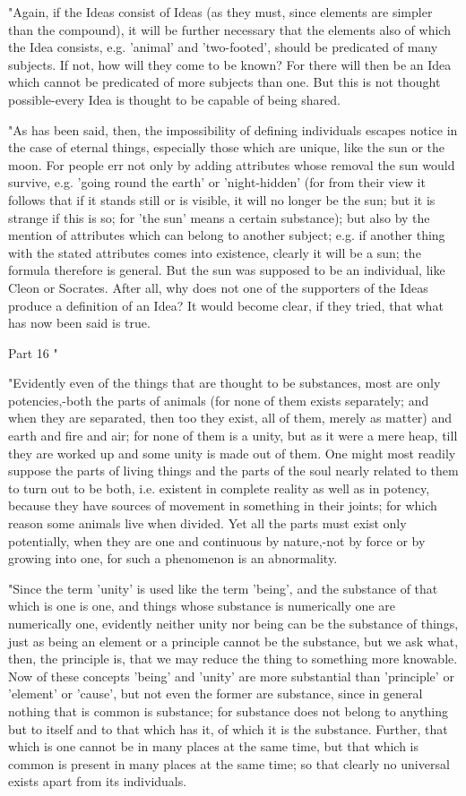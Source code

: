 "Again, if the Ideas consist of Ideas (as they must, since elements
are simpler than the compound), it will be further necessary that
the elements also of which the Idea consists, e.g. 'animal' and 'two-footed',
should be predicated of many subjects. If not, how will they come
to be known? For there will then be an Idea which cannot be predicated
of more subjects than one. But this is not thought possible-every
Idea is thought to be capable of being shared. 

"As has been said, then, the impossibility of defining individuals
escapes notice in the case of eternal things, especially those which
are unique, like the sun or the moon. For people err not only by adding
attributes whose removal the sun would survive, e.g. 'going round
the earth' or 'night-hidden' (for from their view it follows that
if it stands still or is visible, it will no longer be the sun; but
it is strange if this is so; for 'the sun' means a certain substance);
but also by the mention of attributes which can belong to another
subject; e.g. if another thing with the stated attributes comes into
existence, clearly it will be a sun; the formula therefore is general.
But the sun was supposed to be an individual, like Cleon or Socrates.
After all, why does not one of the supporters of the Ideas produce
a definition of an Idea? It would become clear, if they tried, that
what has now been said is true. 

Part 16 "

"Evidently even of the things that are thought to be substances, most
are only potencies,-both the parts of animals (for none of them exists
separately; and when they are separated, then too they exist, all
of them, merely as matter) and earth and fire and air; for none of
them is a unity, but as it were a mere heap, till they are worked
up and some unity is made out of them. One might most readily suppose
the parts of living things and the parts of the soul nearly related
to them to turn out to be both, i.e. existent in complete reality
as well as in potency, because they have sources of movement in something
in their joints; for which reason some animals live when divided.
Yet all the parts must exist only potentially, when they are one and
continuous by nature,-not by force or by growing into one, for such
a phenomenon is an abnormality. 

"Since the term 'unity' is used like the term 'being', and the substance
of that which is one is one, and things whose substance is numerically
one are numerically one, evidently neither unity nor being can be
the substance of things, just as being an element or a principle cannot
be the substance, but we ask what, then, the principle is, that we
may reduce the thing to something more knowable. Now of these concepts
'being' and 'unity' are more substantial than 'principle' or 'element'
or 'cause', but not even the former are substance, since in general
nothing that is common is substance; for substance does not belong
to anything but to itself and to that which has it, of which it is
the substance. Further, that which is one cannot be in many places
at the same time, but that which is common is present in many places
at the same time; so that clearly no universal exists apart from its
individuals. 

